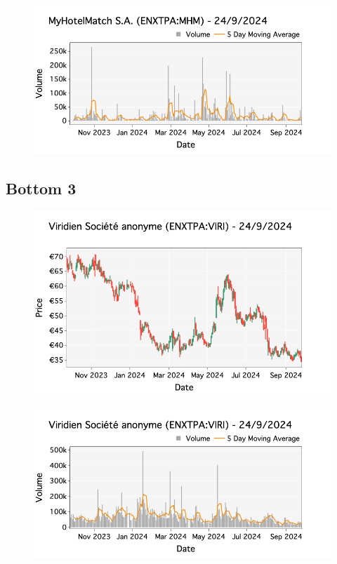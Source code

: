 \documentclass[a4paper, twocolumn, 11pt, paperequity]{gorgona}
\begin{document}
\begin{figure}[H]
    \centering
    \includegraphics[width=\columnwidth]{France/images/Bottom_Returns/Bottom_2_volume.png}
\end{figure}

\subsection*{Bottom 3}

\begin{figure}[H]
    \centering
    \includegraphics[width=\columnwidth]{France/images/Bottom_Returns/Bottom_3_candlestick.png}
\end{figure}

\begin{figure}[H]
    \centering
    \includegraphics[width=\columnwidth]{France/images/Bottom_Returns/Bottom_3_volume.png}
\end{figure}
\end{document}
